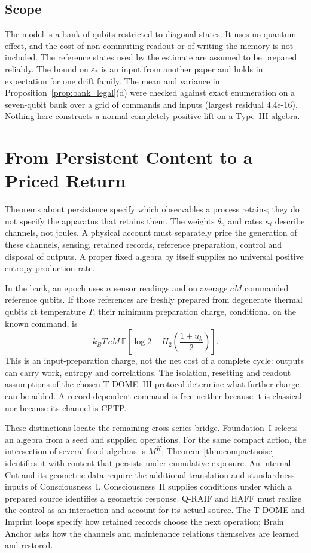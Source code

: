 \documentclass[12pt]{article}
\theoremstyle{definition}
\theoremstyle{remark}
\begin{document}
\subsection{Scope}\label{subsec:bank_scope}

The model is a bank of qubits restricted to diagonal states. It uses no quantum effect, and the cost of non-commuting readout or of writing the memory is not included. The reference states used by the estimate are assumed to be prepared reliably. The bound on $\varepsilon_*$ is an input from another paper and holds in expectation for one drift family. The mean and variance in Proposition~\ref{prop:bank_legal}(d) were checked against exact enumeration on a seven-qubit bank over a grid of commands and inputs (largest residual 4.4e-16). Nothing here constructs a normal completely positive lift on a Type~III algebra.

\section{From Persistent Content to a Priced Return}\label{sec:pricedreturn}

Theorems about persistence specify which observables a process retains;
they do not specify the apparatus that retains them. The weights
\(\theta_n\) and rates \(\kappa_i\) describe channels, not joules.
A physical account must separately price the generation of these
channels, sensing, retained records, reference preparation, control
and disposal of outputs. A proper fixed algebra by itself supplies
no universal positive entropy-production rate.

In the bank, an epoch uses \(n\) sensor readings and on average
\(cM\) commanded reference qubits. If those references are freshly
prepared from degenerate thermal qubits at temperature \(T\), their
minimum preparation charge, conditional on the known command, is
\[
 k_BT\,cM\,\mathbb E\!
 \left[\log2-H_2\!\left(\frac{1+u_k}{2}\right)\right].
\]
This is an input-preparation charge, not the net cost of a complete
cycle: outputs can carry work, entropy and correlations.
The isolation, resetting and readout assumptions of the chosen
T-DOME~III protocol determine what further charge can be added.
A record-dependent command is free neither because it is classical
nor because its channel is CPTP.

These distinctions locate the remaining cross-series bridge.
Foundation~I selects an algebra from a seed and supplied operations.
For the same compact action, the intersection of several fixed
algebras is \(M^K\); Theorem~\ref{thm:compactnoise} identifies it
with content that persists under cumulative exposure.
An internal Cut and its geometric data require the additional
translation and standardness inputs of Consciousness~I.
Consciousness~II supplies conditions under which a prepared source
identifies a geometric response. Q-RAIF and HAFF must realize the
control as an interaction and account for its actual source.
The T-DOME and Imprint loops specify how retained records choose the
next operation; Brain Anchor asks how the channels and maintenance
relations themselves are learned and restored.
\end{document}
